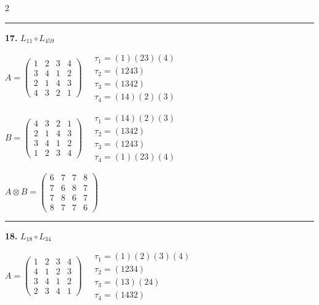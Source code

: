 \begin{multicols}{2}
\vspace{0.3em}
\hrule
\vspace{0.3em}

\noindent\textbf{17.} $L_{11} \circ L_{459}$

$A = \begin{pmatrix} 1 & 2 & 3 & 4 \\ 3 & 4 & 1 & 2 \\ 2 & 1 & 4 & 3 \\ 4 & 3 & 2 & 1 \end{pmatrix} \quad \begin{matrix} \tau_{1}=(1)(2 3)(4) \\ \tau_{2}=(1 2 4 3) \\ \tau_{3}=(1 3 4 2) \\ \tau_{4}=(1 4)(2)(3) \end{matrix}$

$B = \begin{pmatrix} 4 & 3 & 2 & 1 \\ 2 & 1 & 4 & 3 \\ 3 & 4 & 1 & 2 \\ 1 & 2 & 3 & 4 \end{pmatrix} \quad \begin{matrix} \tau_{1}=(1 4)(2)(3) \\ \tau_{2}=(1 3 4 2) \\ \tau_{3}=(1 2 4 3) \\ \tau_{4}=(1)(2 3)(4) \end{matrix}$

$A \otimes B = \begin{pmatrix} 6 & 7 & 7 & 8 \\ 7 & 6 & 8 & 7 \\ 7 & 8 & 6 & 7 \\ 8 & 7 & 7 & 6 \end{pmatrix}$

\vspace{0.3em}
\hrule
\vspace{0.3em}

\noindent\textbf{18.} $L_{18} \circ L_{34}$

$A = \begin{pmatrix} 1 & 2 & 3 & 4 \\ 4 & 1 & 2 & 3 \\ 3 & 4 & 1 & 2 \\ 2 & 3 & 4 & 1 \end{pmatrix} \quad \begin{matrix} \tau_{1}=(1)(2)(3)(4) \\ \tau_{2}=(1 2 3 4) \\ \tau_{3}=(1 3)(2 4) \\ \tau_{4}=(1 4 3 2) \end{matrix}$


\end{multicols}
